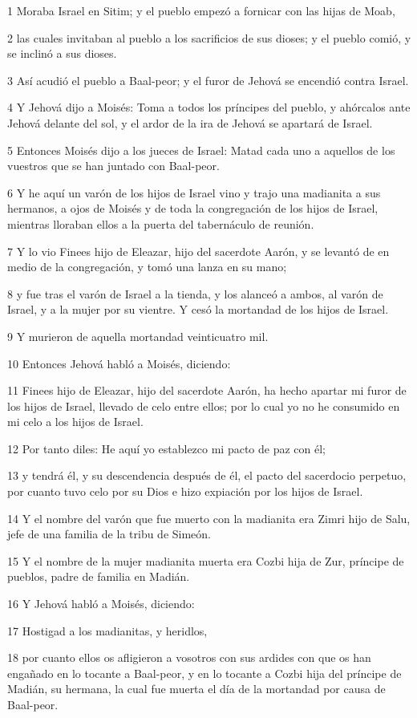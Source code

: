 \par 1 Moraba Israel en Sitim; y el pueblo empezó a fornicar con las hijas de Moab,
\par 2 las cuales invitaban al pueblo a los sacrificios de sus dioses; y el pueblo comió, y se inclinó a sus dioses.
\par 3 Así acudió el pueblo a Baal-peor; y el furor de Jehová se encendió contra Israel.
\par 4 Y Jehová dijo a Moisés: Toma a todos los príncipes del pueblo, y ahórcalos ante Jehová delante del sol, y el ardor de la ira de Jehová se apartará de Israel.
\par 5 Entonces Moisés dijo a los jueces de Israel: Matad cada uno a aquellos de los vuestros que se han juntado con Baal-peor.
\par 6 Y he aquí un varón de los hijos de Israel vino y trajo una madianita a sus hermanos, a ojos de Moisés y de toda la congregación de los hijos de Israel, mientras lloraban ellos a la puerta del tabernáculo de reunión.
\par 7 Y lo vio Finees hijo de Eleazar, hijo del sacerdote Aarón, y se levantó de en medio de la congregación, y tomó una lanza en su mano;
\par 8 y fue tras el varón de Israel a la tienda, y los alanceó a ambos, al varón de Israel, y a la mujer por su vientre. Y cesó la mortandad de los hijos de Israel.
\par 9 Y murieron de aquella mortandad veinticuatro mil.
\par 10 Entonces Jehová habló a Moisés, diciendo:
\par 11 Finees hijo de Eleazar, hijo del sacerdote Aarón, ha hecho apartar mi furor de los hijos de Israel, llevado de celo entre ellos; por lo cual yo no he consumido en mi celo a los hijos de Israel.
\par 12 Por tanto diles: He aquí yo establezco mi pacto de paz con él;
\par 13 y tendrá él, y su descendencia después de él, el pacto del sacerdocio perpetuo, por cuanto tuvo celo por su Dios e hizo expiación por los hijos de Israel.
\par 14 Y el nombre del varón que fue muerto con la madianita era Zimri hijo de Salu, jefe de una familia de la tribu de Simeón.
\par 15 Y el nombre de la mujer madianita muerta era Cozbi hija de Zur, príncipe de pueblos, padre de familia en Madián.
\par 16 Y Jehová habló a Moisés, diciendo:
\par 17 Hostigad a los madianitas, y heridlos,
\par 18 por cuanto ellos os afligieron a vosotros con sus ardides con que os han engañado en lo tocante a Baal-peor, y en lo tocante a Cozbi hija del príncipe de Madián, su hermana, la cual fue muerta el día de la mortandad por causa de Baal-peor.

